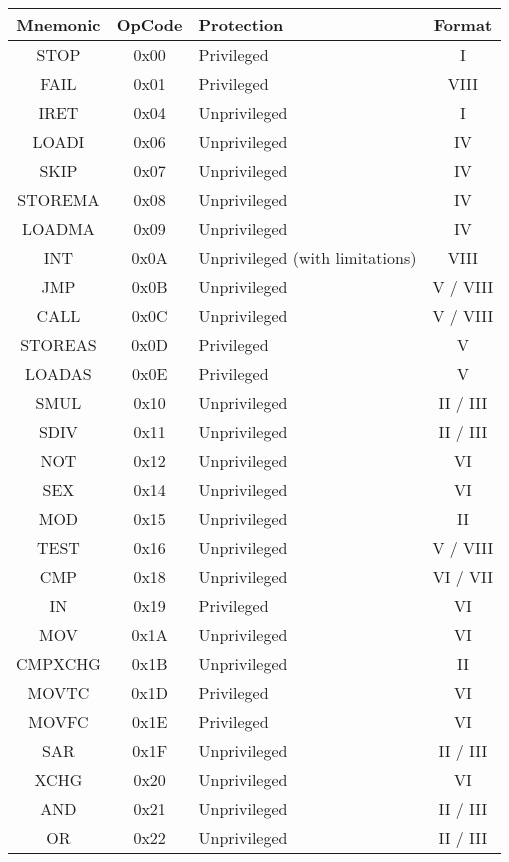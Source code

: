 \begin{tabular}{ | c | c | l | c | }
	\hline                        
	\textbf{Mnemonic} & \textbf{OpCode} & \textbf{Protection} & \textbf{Format} \\
	\hline
	STOP & 0x00 & Privileged & I\\
	\hline
	FAIL & 0x01 & Privileged & VIII\\
	\hline
	IRET & 0x04 & Unprivileged & I\\
	\hline                        
	LOADI & 0x06 & Unprivileged & IV \\
	\hline
	SKIP & 0x07 & Unprivileged & IV \\
	\hline
	STOREMA & 0x08 & Unprivileged & IV \\
	\hline
	LOADMA & 0x09 & Unprivileged & IV \\
	\hline
	INT & 0x0A & Unprivileged (with limitations) & VIII\\
	\hline
	JMP & 0x0B & Unprivileged & V / VIII \\
	\hline
	CALL & 0x0C & Unprivileged & V / VIII \\
	\hline
	STOREAS & 0x0D & Privileged & V \\
	\hline
	LOADAS & 0x0E & Privileged & V \\
	\hline
	SMUL & 0x10 & Unprivileged & II / III\\
	\hline
	SDIV & 0x11 & Unprivileged & II / III\\
	\hline
	NOT & 0x12 & Unprivileged & VI\\
	\hline
	SEX & 0x14 & Unprivileged & VI\\
	\hline
	MOD & 0x15 & Unprivileged & II \\
	\hline
	TEST & 0x16 & Unprivileged & V / VIII\\
	\hline
	CMP & 0x18 & Unprivileged & VI / VII\\
	\hline
	IN & 0x19 & Privileged &  VI \\
	\hline
	MOV & 0x1A & Unprivileged & VI\\
	\hline
	CMPXCHG	& 0x1B & Unprivileged & II\\
	\hline
	MOVTC & 0x1D & Privileged & VI \\
	\hline
	MOVFC & 0x1E & Privileged & VI \\
	\hline
	SAR & 0x1F & Unprivileged & II / III\\
	\hline
	XCHG & 0x20 & Unprivileged & VI\\
	\hline
	AND & 0x21 & Unprivileged & II / III\\
	\hline
	OR & 0x22 & Unprivileged & II / III\\

\end{tabular}
